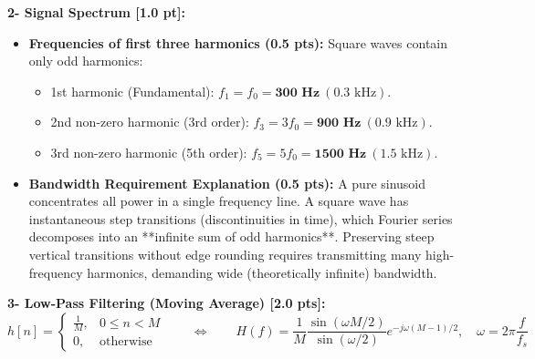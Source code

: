 \documentclass[10pt,a4paper]{article}
\begin{document}
\noindent\textbf{2- Signal Spectrum [1.0 pt]:}
\begin{itemize}[leftmargin=12pt, itemsep=1.5pt]
    \item \textbf{Frequencies of first three harmonics (0.5 pts):} Square waves contain only odd harmonics:
    \begin{itemize}[leftmargin=10pt, itemsep=0.5pt]
        \item 1st harmonic (Fundamental): $f_1 = f_0 = \mathbf{300\text{ Hz}}\ (0.3\text{ kHz})$.
        \item 2nd non-zero harmonic (3rd order): $f_3 = 3f_0 = \mathbf{900\text{ Hz}}\ (0.9\text{ kHz})$.
        \item 3rd non-zero harmonic (5th order): $f_5 = 5f_0 = \mathbf{1500\text{ Hz}}\ (1.5\text{ kHz})$.
    \end{itemize}
    \item \textbf{Bandwidth Requirement Explanation (0.5 pts):} A pure sinusoid concentrates all power in a single frequency line. A square wave has instantaneous step transitions (discontinuities in time), which Fourier series decomposes into an **infinite sum of odd harmonics**. Preserving steep vertical transitions without edge rounding requires transmitting many high-frequency harmonics, demanding wide (theoretically infinite) bandwidth.
\end{itemize}

\vspace{1pt}

\noindent\textbf{3- Low-Pass Filtering (Moving Average) [2.0 pts]:}
$$h[n] = \begin{cases} \frac{1}{M}, & 0 \le n < M \\ 0, & \text{otherwise} \end{cases} \qquad \Longleftrightarrow \qquad H(f) = \frac{1}{M} \frac{\sin(\omega M / 2)}{\sin(\omega / 2)} e^{-j\omega(M-1)/2}, \quad \omega = 2\pi \frac{f}{f_s}$$
\end{document}
